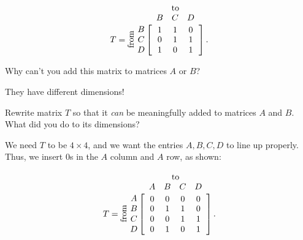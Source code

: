 \documentclass[../key.tex]{subfiles}
\begin{document}
$$T = \rotatebox[origin=c]{90}{from}\;\,
  \begin{array}{@{}c@{}}
    \rowind{B} \\ \rowind{C} \\ \rowind{D}
  \end{array}
  \mathop{\left[
  \begin{array}{ccc}
     \colind{1}{B}  &  \colind{1}{C}  &  \colind{0}{D} \\
     0 & 1 & 1 \\
     1 & 0 & 1 \\
  \end{array}
  \right]}^{
  \begin{array}{@{}c@{}}
    \rowind{\text{to}} \\ \mathstrut
  \end{array}
  }.$$

\begin{inner_problem}[start=1]
\item Why can't you add this matrix to matrices $A$ or $B$?
\end{inner_problem}

They have different dimensions!

\begin{inner_problem}
\item Rewrite matrix $T$ so that it \textit{can} be meaningfully added to matrices $A$ and $B$. What did you do to its dimensions?
\end{inner_problem}

We need $T$ to be $4\times 4$, and we want the entries $A,B,C,D$ to line up properly. Thus, we insert $0$s in the $A$ column and $A$ row, as shown:

$$T = \rotatebox[origin=c]{90}{from}\;\,
  \begin{array}{@{}c@{}}
    \rowind{A} \\ \rowind{B} \\ \rowind{C} \\ \rowind{D}
  \end{array}
  \mathop{\left[
  \begin{array}{cccc}
     \colind{0}{A} & \colind{0}{B}  &  \colind{0}{C}  &  \colind{0}{D} \\
     0 & 1 & 1 & 0 \\
     0 & 0 & 1 & 1 \\
     0 & 1 & 0 & 1 \\
  \end{array}
  \right]}^{
  \begin{array}{@{}c@{}}
    \rowind{\text{to}} \\ \mathstrut
  \end{array}
  }.$$
\end{document}

